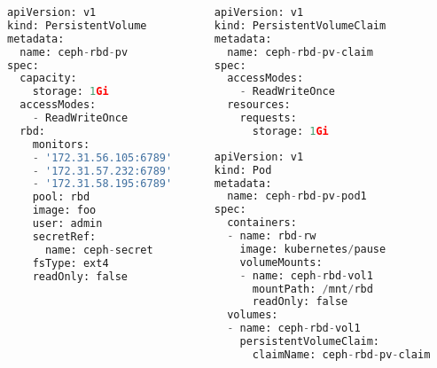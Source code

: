 \begin{frame}[fragile]
\begin{columns}
    \begin{column}{0.4\textwidth}
\begin{lstlisting}[language=python]
apiVersion: v1
kind: PersistentVolume
metadata:
  name: ceph-rbd-pv
spec:
  capacity:
    storage: 1Gi
  accessModes:
    - ReadWriteOnce
  rbd:
    monitors:
    - '172.31.56.105:6789'
    - '172.31.57.232:6789'
    - '172.31.58.195:6789'
    pool: rbd
    image: foo
    user: admin
    secretRef:
      name: ceph-secret
    fsType: ext4
    readOnly: false
\end{lstlisting}
    \end{column}
    \begin{column}{0.4\textwidth}
\begin{lstlisting}[language=python]
apiVersion: v1
kind: PersistentVolumeClaim
metadata:
  name: ceph-rbd-pv-claim
spec:
  accessModes:
    - ReadWriteOnce
  resources:
    requests:
      storage: 1Gi
\end{lstlisting}

\begin{lstlisting}[language=python]
apiVersion: v1
kind: Pod
metadata:
  name: ceph-rbd-pv-pod1
spec:
  containers:
  - name: rbd-rw
    image: kubernetes/pause
    volumeMounts:
    - name: ceph-rbd-vol1
      mountPath: /mnt/rbd
      readOnly: false
  volumes:
  - name: ceph-rbd-vol1
    persistentVolumeClaim:
      claimName: ceph-rbd-pv-claim
\end{lstlisting}
    \end{column}
\end{columns}
\end{frame}

